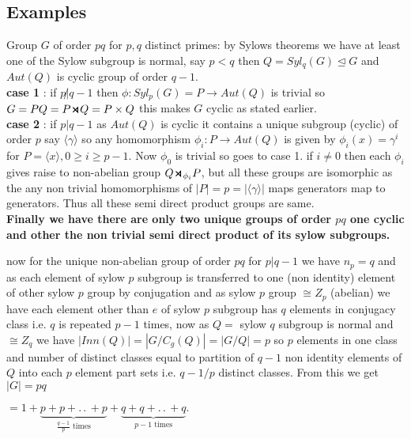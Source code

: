 \documentclass[11pt]{extarticle}
\newcommand{\ra}{\rightarrow}
\newcommand{\w}[1]{\text{#1}}
\newcommand{\ck}{.\,.\,}
\newcommand{\smdp}{ \,
\begin{tikzpicture}
	\draw[thick] (0,0)--(1ex,1ex)--(1ex,0)--(0,1ex);
\end{tikzpicture} 
\,
}
\newcommand{\gen}[1]{\langle #1 \rangle}
\newcommand{\tbx}[2][]{
	\begin{tcolorbox}[enhanced,breakable,size=small,colback=black!2!white,title={#1},arc is angular, arc=1.5mm,drop fuzzy shadow]
		#2
	\end{tcolorbox}
}
\begin{document}
\begin{multicols}{2}
	\subsection{Examples}
	\tbx{
		Group $ G $ of order $ pq $  for $ p,q $ distinct primes: by Sylows theorems we have at least one of the Sylow subgroup is normal, say $ p<q $ then $ Q= Syl_q(G) \trianglelefteq G$ and $ Aut(Q) $ is cyclic group of order $ q-1 .$\\
		\textbf{case 1} : if $ p\not|q-1 $ then $ \phi :  Syl_p(G)=P\ra Aut(Q)$ is trivial so $ G= PQ=P\smdp Q = P \times Q $ this makes $ G $ cyclic as stated earlier.\\
		\textbf{case 2} : if $ p|q-1 $ as $ Aut(Q) $ is cyclic it contains a unique subgroup (cyclic) of order $ p $ say 
		$ \gen{\gamma }$ so any homomorphism $ \phi_i : P \ra Aut(Q)  $ is given by $ \phi_i(x)=\gamma^i $ for $ P=\gen{x}, 0\geq i \geq p-1 $. Now $ \phi_0 $ is trivial so goes to case 1. if $ i\neq 0 $ then each $ \phi_i $ gives raise to non-abelian group $ Q \smdp_{\phi_i} P $, but all these groups are isomorphic as the  any non trivial homomorphisms of $ |P|=p = |\gen{\gamma}|$ maps generators map to generators. Thus all these semi direct product groups are same.\\
		\textbf{Finally we  have there are only two unique groups of order $ pq $ one cyclic and other the non trivial semi direct product of its sylow subgroups.}}
	
	\tbx[\small Class equation of non abelian $pq $ order group]{ now for the unique non-abelian group of order $ pq $ for $ p|q-1 $ we have $ n_p=q$ and as each element of sylow $ p $ subgroup is transferred to one (non identity) element of other sylow $ p $ group by conjugation and as sylow $ p $ group $ \cong Z_p$ (abelian) we have each element other than $ e $ of sylow $ p $ subgroup has  $ q $ elements in conjugacy class i.e. $ q $ is repeated $ p-1 $ times, now as  $ Q= $ sylow $ q $ subgroup is normal and $ \cong Z_q $ we have $ |Inn(Q)|=|G/C_g(Q)|=|G/Q|=p $ so $ p $ elements in one class and number of distinct classes equal to partition of $ q-1 $ non identity elements of $ Q $ into each $ p $ element part sets i.e. $ q-1/p $  distinct classes. From this we get \\
		$ |G|=pq$
		\begin{center}
			$=1+\underbrace{p+p+\ck +p}_{\frac{ q-1 }{p}\w{ times}}+\underbrace{q+q+\ck+q}_{p-1 \w{ times}} .$
	\end{center}  }
	

\end{multicols}
\end{document}
